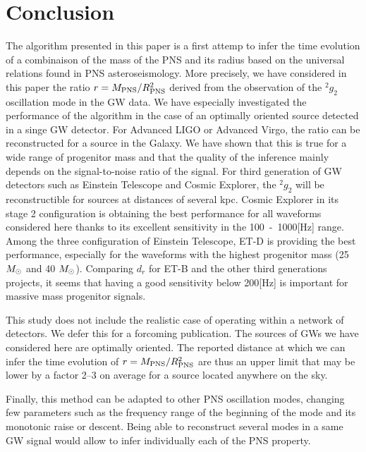 \section{Conclusion}
The algorithm presented in this paper is a first attemp to infer the time evolution of a
combinaison of the mass of the PNS and its radius based on the universal relations found
in PNS asteroseismology. More precisely, we have considered in this paper the ratio
$r=M_{\rm PNS}/R_{\rm PNS}^2$ derived from the observation of the $\mbox{}^2g_2$
oscillation mode in the GW data. We have especially investigated the performance of the algorithm
in the case of an optimally oriented source detected in a singe GW detector. For Advanced LIGO
or Advanced Virgo, the ratio can be reconstructed for a source in the Galaxy. We have shown
that this is true for a wide range of progenitor mass and that the quality of the inference
mainly depends on the signal-to-noise ratio of the signal. For third generation of GW detectors such
as Einstein Telescope and Cosmic Explorer, the $\mbox{}^2g_2$ will be reconstructible for sources
at distances of several kpc. Cosmic Explorer in its stage 2 configuration is obtaining the best performance
for all waveforms considered here thanks to its excellent sensitivity in the \unit{100-1000}[Hz] range.
Among the three configuration of Einstein Telescope, ET-D is providing the best performance,
especially for the waveforms with the highest progenitor mass (25 $M_{\odot}$ and 40 $M_{\odot}$). Comparing
$d_r$ for ET-B and the other third generations projects, it seems that having a good sensitivity
below \unit{200}[Hz] is important for massive mass progenitor signals.

This study does not include the realistic case of operating within a network of detectors. We defer this
for a forcoming publication. The sources of GWs we have considered here are optimally oriented. The
reported distance at which we can infer the time evolution of $r=M_{\rm PNS}/R_{\rm PNS}^2$ are thus an
upper limit that may be lower by a factor 2--3 on average for a source located anywhere on the sky.

Finally, this method can be adapted to other PNS oscillation modes, changing few parameters such as
the frequency range of the beginning of the mode and its monotonic raise or descent. Being able to
reconstruct several modes in a same GW signal would allow to infer individually each of the PNS property.

